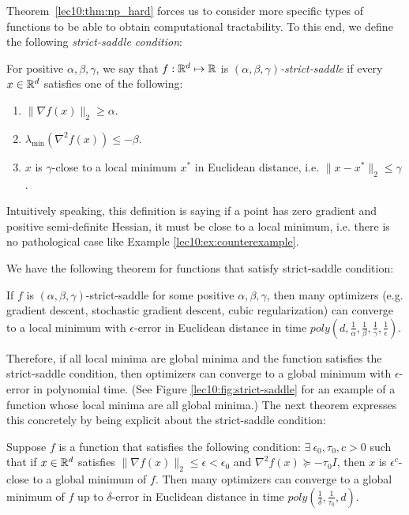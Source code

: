 Theorem~\ref{lec10:thm:np_hard} forces us to consider more specific types of functions to be able to obtain computational tractability. To this end, we define the following \textit{strict-saddle condition}:

\begin{definition} 
For positive $\alpha, \beta, \gamma$, we say that $f: \mathbb R^d \mapsto \mathbb R$ is \textit{$(\alpha, \beta, \gamma)$-strict-saddle} if every $x \in \mathbb R^d$ satisfies one of the following:
\begin{enumerate}
    \item $\|\nabla f(x)\|_2 \geq \alpha$.
    \item $\lambda_{\min}(\nabla^2 f(x)) \leq -\beta$.
    \item $x$ is $\gamma$-close to a local minimum $x^*$ in Euclidean distance, i.e. $\|x - x^*\|_2 \leq \gamma$.
\end{enumerate}
\end{definition}

Intuitively speaking, this definition is saying if a point has zero gradient and positive semi-definite Hessian, it must be close to a local minimum, i.e. there is no pathological case like Example \ref{lec10:ex:counterexample}.

We have the following theorem for functions that satisfy strict-saddle condition:

\begin{theorem} 
If $f$ is $(\alpha, \beta, \gamma)$-strict-saddle for some positive $\alpha, \beta, \gamma$, then many optimizers (e.g. gradient descent, stochastic gradient descent, cubic regularization) can converge to a local minimum with $\epsilon$-error in Euclidean distance in time $poly \left(d, \frac{1}{\alpha}, \frac{1}{\beta}, \frac{1}{\gamma}, \frac{1}{\epsilon}\right)$.
\end{theorem}

Therefore, if all local minima are global minima and the function satisfies the strict-saddle condition, then optimizers can converge to a global minimum with $\epsilon$-error in polynomial time. (See Figure \ref{lec10:fig:strict-saddle} for an example of a function whose local minima are all global minima.) The next theorem expresses this concretely by being explicit about the strict-saddle condition:

\begin{theorem}
Suppose $f$ is a function that satisfies the following condition: $\exists  \ \epsilon_0, \tau_0, c > 0$ such that if $x \in \mathbb R^d$ satisfies $\|\nabla f(x)\|_2 \leq \epsilon < \epsilon_0$ and $\nabla^2 f(x) \succeq -\tau_0I$, then $x$ is $\epsilon^c$-close to a global minimum of $f$. Then many optimizers can converge to a global minimum of $f$ up to $\delta$-error in Euclidean distance in time $poly\left(\frac{1}{\delta}, \frac{1}{\tau_0}, d \right)$.
\end{theorem}

